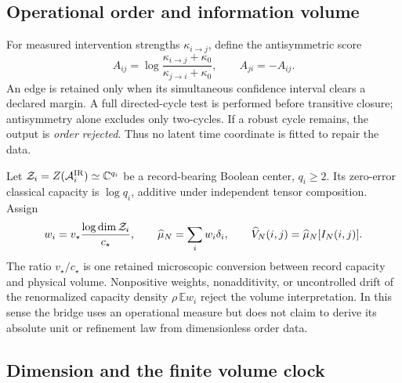 \subsection{Operational order and information volume}

For measured intervention strengths \(\kappa_{i\to j}\), define the
antisymmetric score
\begin{equation}
 A_{ij}=\log\frac{\kappa_{i\to j}+\kappa_0}
 {\kappa_{j\to i}+\kappa_0},
 \qquad A_{ji}=-A_{ij}.
 \label{eq:generic-response-score}
\end{equation}
An edge is retained only when its simultaneous confidence interval clears a
declared margin.  A full directed-cycle test is performed before transitive
closure; antisymmetry alone excludes only two-cycles.  If a robust cycle
remains, the output is \emph{order rejected}.  Thus no latent time coordinate
is fitted to repair the data.

Let \(\mathcal Z_i=Z(\mathcal A_i^{\rm IR})\simeq\mathbb C^{q_i}\) be a record-bearing
Boolean center, \(q_i\ge2\).  Its zero-error classical capacity is
\(\log q_i\), additive under independent tensor composition.  Assign
\begin{equation}
 w_i=v_\star\frac{\log\dim\mathcal Z_i}{c_\star},
 \qquad
 \widehat\mu_N=\sum_iw_i\delta_i,
 \qquad
 \widehat V_N(i,j)=\widehat\mu_N[I_N(i,j)] .
 \label{eq:generic-record-volume}
\end{equation}
The ratio \(v_\star/c_\star\) is one retained microscopic conversion between
record capacity and physical volume.  Nonpositive weights, nonadditivity, or
uncontrolled drift of the renormalized capacity density
\(\rho\,\mathbb E w_i\) reject the volume interpretation.  In this sense the
bridge uses an operational measure but does not claim to derive its absolute
unit or refinement law from dimensionless order data.

\subsection{Dimension and the finite volume clock}

